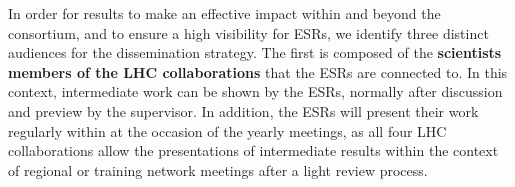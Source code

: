 


In order for \acronym results to make an effective impact within and beyond the consortium, and to ensure a high visibility for ESRs, we identify three distinct audiences for the dissemination strategy. 
The first is composed of the \textbf{scientists members of the LHC collaborations} that the ESRs are connected to. 
In this context, intermediate work can be shown by the ESRs, normally after discussion and preview by the supervisor. 
In addition, the ESRs will present their work regularly within \acronym at the occasion of the yearly meetings, as all four LHC collaborations allow the presentations of intermediate results within the context of regional or training network meetings after a light review process. 

